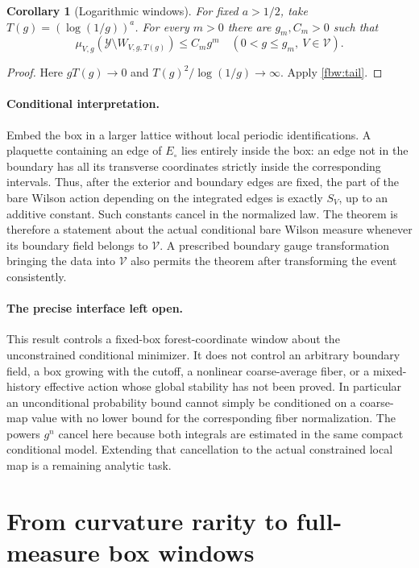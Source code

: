 \documentclass[11pt]{article}
\newtheorem{corollary}[theorem]{Corollary}
\theoremstyle{remark}
\begin{document}
\begin{corollary}[Logarithmic windows]
\label{fbw:logwindow}
For fixed \(a>1/2\), take \(T(g)=(\log(1/g))^a\). For every
\(m>0\) there are \(g_m,C_m>0\) such that
\[
 \mu_{V,g}(\mathcal Y\setminus W_{V,g,T(g)})\leq C_m g^m
 \quad(0<g\leq g_m,\ V\in\mathcal V).
\]
\end{corollary}
\begin{proof}
Here \(gT(g)\to0\) and \(T(g)^2/\log(1/g)\to\infty\).
Apply \eqref{fbw:tail}.
\end{proof}

\paragraph{Conditional interpretation.}
Embed the box in a larger lattice without local periodic
identifications. A plaquette containing an edge of \(E_\circ\)
lies entirely inside the box: an edge not in the boundary has all
its transverse coordinates strictly inside the corresponding
intervals. Thus, after the exterior and boundary edges are fixed,
the part of the bare Wilson action depending on the integrated edges
is exactly \(S_V\), up to an additive constant. Such constants cancel
in the normalized law. The theorem is therefore a statement about
the actual conditional bare Wilson measure whenever its boundary
field belongs to \(\mathcal V\). A prescribed boundary gauge
transformation bringing the data into \(\mathcal V\) also permits
the theorem after transforming the event consistently.

\paragraph{The precise interface left open.}
This result controls a fixed-box forest-coordinate window about
the unconstrained conditional minimizer. It does not control an
arbitrary boundary field, a box growing with the cutoff, a
nonlinear coarse-average fiber, or a mixed-history effective action
whose global stability has not been proved. In particular an
unconditional probability bound cannot simply be conditioned on a
coarse-map value with no lower bound for the corresponding fiber
normalization. The powers \(g^n\) cancel here because both integrals
are estimated in the same compact conditional model. Extending
that cancellation to the actual constrained local map is a
remaining analytic task.


\section{From curvature rarity to full-measure box windows}
\label{fbb:section}
\end{document}
